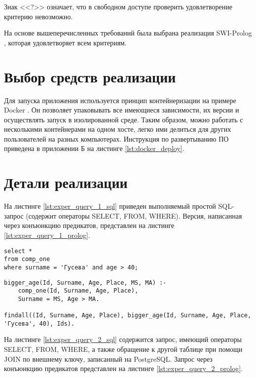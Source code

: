 Знак <<?>> означает, что в свободном доступе проверить удовлетворение критерию невозможно.

На основе вышеперечисленных требований была выбрана реализация SWI-Prolog \cite{swi_prolog}, которая удовлетворяет всем критериям.

\section{Выбор средств реализации}
\vspace{-0.5cm}
Для запуска приложения используется принцип контейнеризации на примере Docker \cite{docker}. Он позволяет упаковывать все имеющиеся зависимости, их версии и осуществлять запуск в изолированной среде. Таким образом, можно работать с несколькими контейнерами на одном хосте, легко ими делиться для других пользователей на разных компьютерах. Инструкция по развертыванию ПО приведена в приложении Б на листинге \ref{lst:docker_deploy}.

\section{Детали реализации}
\vspace{-0.5cm}
На листинге \ref{lst:exper_query_1_sql} приведен выполняемый простой SQL-запрос (содержит операторы SELECT, FROM, WHERE).  Версия, написанная через конъюнкцию предикатов, представлен на листинге \ref{lst:exper_query_1_prolog}.

\begin{lstlisting}[label=lst:exper_query_1_sql, caption=Простой SQL-запрос, basicstyle=\small, numbers = none]
select *
from comp_one
where surname = 'Гусева' and age > 40;
\end{lstlisting}
\begin{lstlisting}[label=lst:exper_query_1_prolog, caption=Простой запрос в версии SWI-Prolog, basicstyle=\small, numbers = none]
bigger_age(Id, Surname, Age, Place, MS, MA) :- 
	comp_one(Id, Surname, Age, Place),
	Surname = MS, Age > MA.
	
findall((Id, Surname, Age, Place), bigger_age(Id, Surname, Age, Place, 'Гусева', 40), Ids).
\end{lstlisting}

На листинге \ref{lst:exper_query_2_sql} содержится запрос, имеющий операторы SELECT, FROM, WHERE, а также обращение к другой таблице при помощи JOIN по внешнему ключу, записанный на PostgreSQL. Запрос через конъюнкцию предикатов представлен на листинге \ref{lst:exper_query_2_prolog}.

